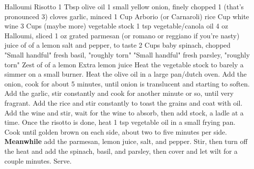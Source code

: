 \documentclass[../cookbook.tex]{subfiles}
\begin{document}
\begin{recipe}{Halloumi Risotto}
\ingredients
{1 Tbsp olive oil}
{1 small yellow onion, finely chopped}
{1 (that's pronounced 3) cloves garlic, minced}
{1 Cup Arborio (or Carnaroli) rice}
{ Cup white wine}
{3 Cups (maybe more) vegetable stock}
{1 tsp vegetable/canola oil}
{4 oz Halloumi, sliced}
{1 oz grated parmesan (or romano or reggiano if you're nasty)}
{juice of  of a lemon}
{salt and pepper, to taste}
{2 Cups baby spinach, chopped}
{"Small handful" fresh basil, "roughly torn"}
{"Small handful" fresh parsley, "roughly torn"}
{Zest of  of a lemon}
{Extra lemon juice}
\stopingredients
\preparation
{Heat the vegetable stock to barely a simmer on a small burner.}
{Heat the olive oil in a large pan/dutch oven. Add the onion, cook for about 5 minutes, until onion is translucent and starting to soften.}
{Add the garlic, stir constantly and cook for another minute or so, until very fragrant.}
{Add the rice and stir constantly to toast the grains and coat with oil.}
{Add the wine and stir, wait for the wine to absorb, then add stock, a ladle at a time.}
{Once the risotto is done, heat 1 tsp vegetable oil in a small frying pan. Cook until golden brown on each side, about two to five minutes per side.}
{\textbf{Meanwhile} add the parmesan, lemon juice, salt, and pepper. Stir, then turn off the heat and add the spinach, basil, and parsley, then cover and let wilt for a couple minutes.}
{Serve.}
\stopprep
\end{recipe}
\end{document}
